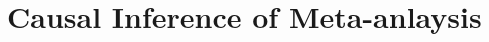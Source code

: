 \documentclass[11pt,openright,twoside,letterpaper,onecolumn]{report} %
\begin{document}
\part{Causal Inference of Meta-anlaysis}
\label{sec:meta}


% 

% 
% 

% 
%  
\end{document}
